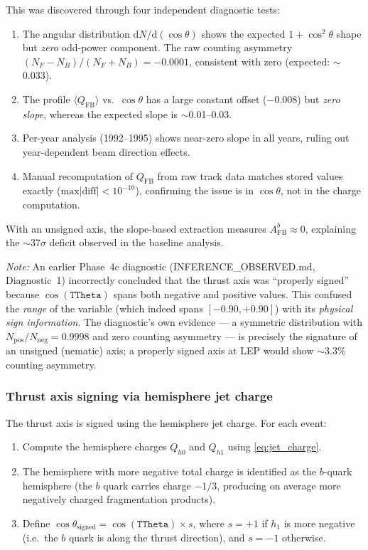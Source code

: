 \documentclass[11pt,a4paper]{article}
\begin{document}
This was discovered through four independent diagnostic tests:
\begin{enumerate}
\item The angular distribution $\mathrm{d}N/\mathrm{d}(\cos\theta)$
  shows the expected $1 + \cos^2\theta$ shape but \emph{zero}
  odd-power component.
  The raw counting asymmetry
  $(N_F - N_B)/(N_F + N_B) = -0.0001$, consistent with zero
  (expected: $\sim$0.033).
\item The profile $\langle Q_\text{FB}\rangle$ vs.\
  $\cos\theta$ has a large constant offset ($-0.008$) but
  \emph{zero slope}, whereas the expected slope is
  $\sim$0.01--0.03.
\item Per-year analysis (1992--1995) shows near-zero slope in
  all years, ruling out year-dependent beam direction effects.
\item Manual recomputation of $Q_\text{FB}$ from raw track data
  matches stored values exactly ($\text{max}|{\text{diff}}| <
  10^{-10}$), confirming the issue is in $\cos\theta$, not in
  the charge computation.
\end{enumerate}

With an unsigned axis, the slope-based extraction measures
$A_\text{FB}^b \approx 0$, explaining the $\sim$37$\sigma$
deficit observed in the baseline analysis.

\textit{Note:} An earlier Phase~4c diagnostic (INFERENCE\_OBSERVED.md,
Diagnostic~1) incorrectly concluded that the thrust axis was
``properly signed'' because $\cos(\texttt{TTheta})$ spans both
negative and positive values.
This confused the \emph{range} of the variable (which indeed
spans $[-0.90, +0.90]$) with its \emph{physical sign information}.
The diagnostic's own evidence --- a symmetric distribution with
$N_\text{pos}/N_\text{neg} = 0.9998$ and zero counting asymmetry ---
is precisely the signature of an unsigned (nematic) axis; a properly
signed axis at LEP would show $\sim$3.3\% counting asymmetry.

\subsubsection{Thrust axis signing via hemisphere jet charge}
\label{sec:corrections:signing}

The thrust axis is signed using the hemisphere jet charge.
For each event:
\begin{enumerate}
\item Compute the hemisphere charges $Q_{h0}$ and $Q_{h1}$
  using \cref{eq:jet_charge}.
\item The hemisphere with more negative total charge is identified
  as the $b$-quark hemisphere (the $b$ quark carries charge
  $-1/3$, producing on average more negatively charged
  fragmentation products).
\item Define
  $\cos\theta_\text{signed} = \cos(\texttt{TTheta}) \times s$,
  where $s = +1$ if $h_1$ is more negative (i.e.\ the $b$ quark
  is along the thrust direction), and $s = -1$ otherwise.
\end{enumerate}
\end{document}
